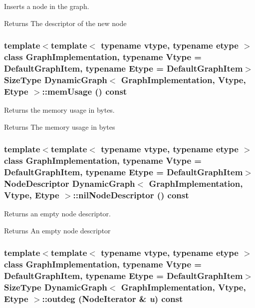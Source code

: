 Inserts a node in the graph. 

\begin{DoxyReturn}{Returns}
The descriptor of the new node 
\end{DoxyReturn}
\hypertarget{class_dynamic_graph_a2f637804e11d0dd69398ef2b1b1c19ee}{
\subsubsection[{memUsage}]{\setlength{\rightskip}{0pt plus 5cm}template$<$template$<$ typename vtype, typename etype $>$ class GraphImplementation, typename Vtype  = DefaultGraphItem, typename Etype  = DefaultGraphItem$>$ SizeType {\bf DynamicGraph}$<$ GraphImplementation, Vtype, Etype $>$::memUsage () const}}
\label{class_dynamic_graph_a2f637804e11d0dd69398ef2b1b1c19ee}


Returns the memory usage in bytes. 

\begin{DoxyReturn}{Returns}
The memory usage in bytes 
\end{DoxyReturn}
\hypertarget{class_dynamic_graph_a1ecc111c5aa2edcb9f6e545fff8c7b18}{
\subsubsection[{nilNodeDescriptor}]{\setlength{\rightskip}{0pt plus 5cm}template$<$template$<$ typename vtype, typename etype $>$ class GraphImplementation, typename Vtype  = DefaultGraphItem, typename Etype  = DefaultGraphItem$>$ NodeDescriptor {\bf DynamicGraph}$<$ GraphImplementation, Vtype, Etype $>$::nilNodeDescriptor () const}}
\label{class_dynamic_graph_a1ecc111c5aa2edcb9f6e545fff8c7b18}


Returns an empty node descriptor. 

\begin{DoxyReturn}{Returns}
An empty node descriptor 
\end{DoxyReturn}
\hypertarget{class_dynamic_graph_af3dcd9a6734363cc7bb0b252dad92659}{
\subsubsection[{outdeg}]{\setlength{\rightskip}{0pt plus 5cm}template$<$template$<$ typename vtype, typename etype $>$ class GraphImplementation, typename Vtype  = DefaultGraphItem, typename Etype  = DefaultGraphItem$>$ SizeType {\bf DynamicGraph}$<$ GraphImplementation, Vtype, Etype $>$::outdeg (NodeIterator \& {\em u}) const}}
\label{class_dynamic_graph_af3dcd9a6734363cc7bb0b252dad92659}


